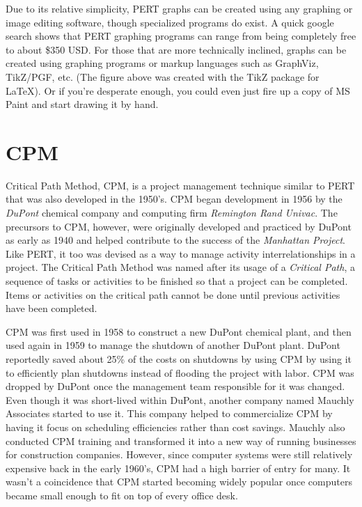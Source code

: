 \documentclass[12pt]{article}
\begin{document}
Due to its relative simplicity, PERT graphs can be created using any graphing or image editing software, though specialized programs do exist.  A quick google search shows that PERT graphing programs can range from being completely free to about \$350 USD.  For those that are more technically inclined, graphs can be created using graphing programs or markup languages such as GraphViz, TikZ/PGF, etc.  (The figure above was created with the TikZ package for LaTeX).  Or if you're desperate enough, you could even just fire up a copy of MS Paint and start drawing it by hand.
\section{CPM}
Critical Path Method, CPM, is a project management technique similar to PERT that was also developed in the 1950's.
CPM began development in 1956 by the \textit{DuPont} chemical company and computing firm \textit{Remington Rand Univac}.  The precursors to CPM, however, were originally developed and practiced by DuPont as early as 1940 and helped contribute to the success of the \textit{Manhattan Project}. 
Like PERT, it too was devised as a way to manage activity interrelationships in a project.
The Critical Path Method was named after its usage of a \textit{Critical Path}, a sequence of tasks or activities to be finished so that a project can be completed.
Items or activities on the critical path cannot be done until previous activities have been completed.

CPM was first used in 1958 to construct a new DuPont chemical plant, and then used again in 1959 to manage the shutdown of another DuPont plant.  DuPont reportedly saved about 25\% of the costs on shutdowns by using CPM by using it to efficiently plan shutdowns instead of flooding the project with labor.  CPM was dropped by DuPont once the management team responsible for it was changed.  Even though it was short-lived within DuPont, another company named Mauchly Associates started to use it.  This company helped to commercialize CPM by having it focus on scheduling efficiencies rather than cost savings.  Mauchly also conducted CPM training and transformed it into a new way of running businesses for construction companies.  However, since computer systems were still relatively expensive back in the early 1960's, CPM had a high barrier of entry for many.  It wasn't a coincidence that CPM started becoming widely popular once computers became small enough to fit on top of every office desk.
\end{document}
